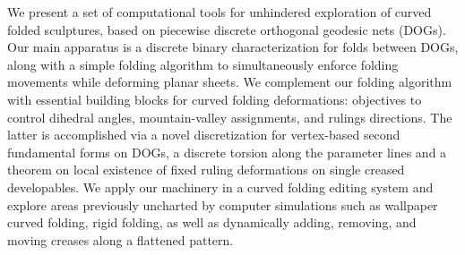 We present a set of computational tools for unhindered exploration of curved folded sculptures, based on piecewise discrete orthogonal geodesic nets (DOGs). Our main apparatus is a discrete binary characterization for folds between DOGs, along with a simple folding algorithm to simultaneously enforce folding movements while deforming planar sheets. We complement our folding algorithm with essential building blocks for curved folding deformations: objectives to control dihedral angles, mountain-valley assignments, and rulings directions. The latter is accomplished via a novel discretization for vertex-based second fundamental forms on DOGs, a discrete torsion along the parameter lines and a theorem on local existence of fixed ruling deformations on single creased developables. We apply our machinery in a curved folding editing system and explore areas previously uncharted by computer simulations such as wallpaper curved folding, rigid folding, as well as dynamically adding, removing, and moving creases along a flattened pattern.